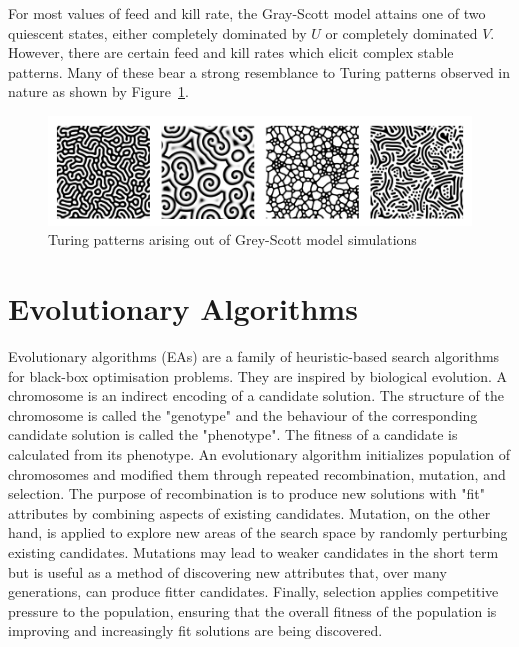 For most values of feed and kill rate, the Gray-Scott model attains one of two quiescent states, either completely dominated by $U$ or completely dominated $V$. However, there are certain feed and kill rates which elicit complex stable patterns. Many of these bear a strong resemblance to Turing patterns observed in nature as shown by Figure~\ref{fig:gs-turing-patterns}.

\begin{figure}[!h]
\centering
\includegraphics[width=\textwidth]{images/turing-patterns.png}
\caption{Turing patterns arising out of Grey-Scott model simulations\cite{sims}}
\label{fig:gs-turing-patterns}
\end{figure}

\section{Evolutionary Algorithms}

Evolutionary algorithms (EAs) are a family of heuristic-based search algorithms for black-box optimisation problems. They are inspired by biological evolution. A chromosome is an indirect encoding of a candidate solution. The structure of the chromosome is called the "genotype" and the behaviour of the corresponding candidate solution is called the "phenotype". The fitness of a candidate is calculated from its phenotype. An evolutionary algorithm initializes population of chromosomes and modified them through repeated recombination, mutation, and selection. The purpose of recombination is to produce new solutions with "fit" attributes by combining aspects of existing candidates. Mutation, on the other hand, is applied to explore new areas of the search space by randomly perturbing existing candidates. Mutations may lead to weaker candidates in the short term but is useful as a method of discovering new attributes that, over many generations, can produce fitter candidates. Finally, selection applies competitive pressure to the population, ensuring that the overall fitness of the population is improving and increasingly fit solutions are being discovered.\\

